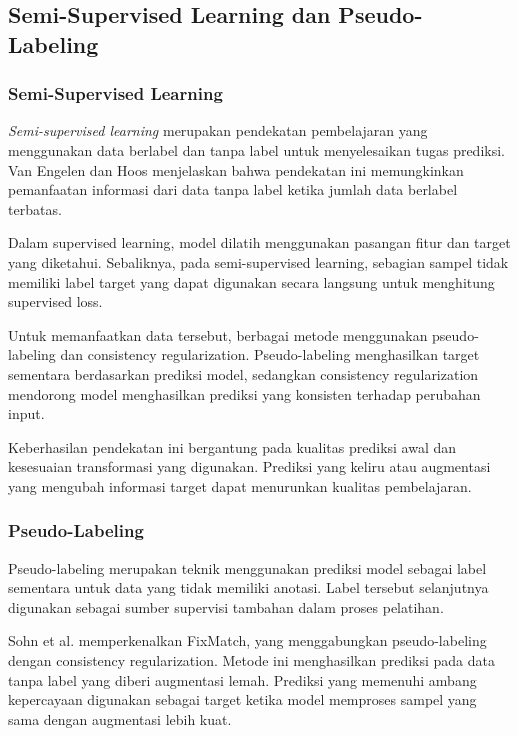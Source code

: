 \subsection{Semi-Supervised Learning dan Pseudo-Labeling}

\subsubsection{Semi-Supervised Learning}

\textit{Semi-supervised learning} merupakan pendekatan pembelajaran yang menggunakan data berlabel dan tanpa label untuk menyelesaikan tugas prediksi. Van Engelen dan Hoos \cite{ref8} menjelaskan bahwa pendekatan ini memungkinkan pemanfaatan informasi dari data tanpa label ketika jumlah data berlabel terbatas.

Dalam supervised learning, model dilatih menggunakan pasangan fitur dan target yang diketahui. Sebaliknya, pada semi-supervised learning, sebagian sampel tidak memiliki label target yang dapat digunakan secara langsung untuk menghitung supervised loss.

Untuk memanfaatkan data tersebut, berbagai metode menggunakan pseudo-labeling dan consistency regularization. Pseudo-labeling menghasilkan target sementara berdasarkan prediksi model, sedangkan consistency regularization mendorong model menghasilkan prediksi yang konsisten terhadap perubahan input.

Keberhasilan pendekatan ini bergantung pada kualitas prediksi awal dan kesesuaian transformasi yang digunakan. Prediksi yang keliru atau augmentasi yang mengubah informasi target dapat menurunkan kualitas pembelajaran.

\subsubsection{Pseudo-Labeling}

Pseudo-labeling merupakan teknik menggunakan prediksi model sebagai label sementara untuk data yang tidak memiliki anotasi. Label tersebut selanjutnya digunakan sebagai sumber supervisi tambahan dalam proses pelatihan.

Sohn et al. \cite{ref9} memperkenalkan FixMatch, yang menggabungkan pseudo-labeling dengan consistency regularization. Metode ini menghasilkan prediksi pada data tanpa label yang diberi augmentasi lemah. Prediksi yang memenuhi ambang kepercayaan digunakan sebagai target ketika model memproses sampel yang sama dengan augmentasi lebih kuat.

